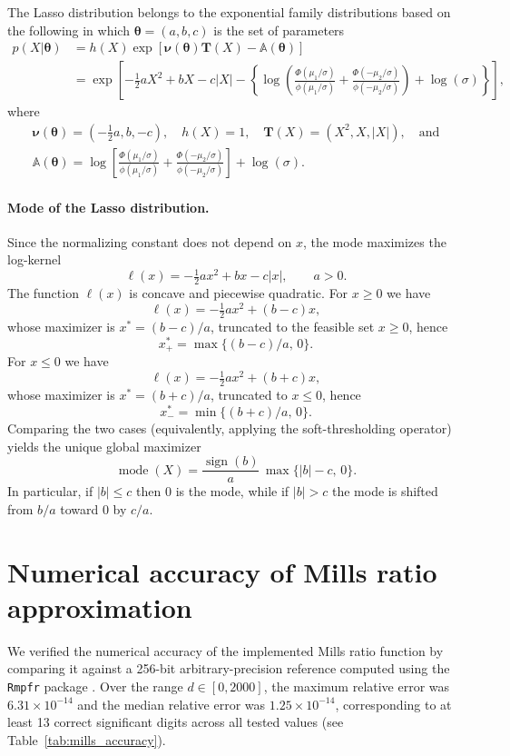 \documentclass[11pt]{article}
\begin{document}
The Lasso distribution belongs to the exponential family distributions based on the following in which ${\boldsymbol\theta} = (a, b, c)$ is the set of parameters
\begin{align*}
p(X|{\boldsymbol\theta})
    & = h(X)\exp\left[{\boldsymbol\nu}({\boldsymbol\theta}) \textbf{T}(X)-\mathbb{A}({\boldsymbol\theta})\right]\\ 
    & = \exp\left[ -\tfrac{1}{2}aX^2+bX-c|X| - \left\{ \log\left(\frac{\Phi(\mu_1/\sigma)}{\phi(\mu_1/\sigma)} + \frac{\Phi(-\mu_2/\sigma)}{\phi(-\mu_2/\sigma)} \right) + \log (\sigma)  \right\} \right], 
\end{align*}
where
$$
\begin{array}{c}
{\boldsymbol\nu}({\boldsymbol\theta}) 
    = (-\frac{1}{2}a,b,-c), 
    \quad
h(X) = 1, 
    \quad 
\textbf{T}(X) = (X^2,X,|X|), \quad \text{and}
\\
\displaystyle \mathbb{A}({\boldsymbol\theta}) 
    = \log\left[ \frac{\Phi(\mu_1/\sigma)}{\phi(\mu_1/\sigma)} + \frac{\Phi(-\mu_2/\sigma)}{\phi(-\mu_2/\sigma)} \right] + \log (\sigma).
\end{array}
$$


\paragraph{Mode of the Lasso distribution.}
Since the normalizing constant does not depend on $x$, the mode maximizes the log-kernel
\[
\ell(x)= -\tfrac12 a x^2 + b x - c|x|,\qquad a>0.
\]
The function $\ell(x)$ is concave and piecewise quadratic. For $x\ge 0$ we have
\[
\ell(x)= -\tfrac12 a x^2 + (b-c)x,
\]
whose maximizer is $x^*=(b-c)/a$, truncated to the feasible set $x\ge 0$, hence
\[
x^*_+ = \max\{(b-c)/a,\,0\}.
\]
For $x\le 0$ we have
\[
\ell(x)= -\tfrac12 a x^2 + (b+c)x,
\]
whose maximizer is $x^*=(b+c)/a$, truncated to $x\le 0$, hence
\[
x^*_- = \min\{(b+c)/a,\,0\}.
\]
Comparing the two cases (equivalently, applying the soft-thresholding operator) yields the unique global maximizer
\[
\operatorname{mode}(X)= \frac{\operatorname{sign}(b)}{a}\,\max\{|b|-c,\,0\}.
\]
In particular, if $|b|\le c$ then $0$ is the mode, while if $|b|>c$ the mode is shifted from $b/a$ toward $0$ by $c/a$.

\section{Numerical accuracy of Mills ratio approximation}
We verified the numerical accuracy of the implemented Mills ratio function by comparing it against a 256-bit arbitrary-precision reference computed using the \texttt{Rmpfr} package \citep{Rmpfr}. Over the range $d \in [0,2000]$, the maximum relative error was $6.31 \times 10^{-14}$ and the median relative error was $1.25 \times 10^{-14}$, corresponding to at least 13 correct significant digits across all tested values (see Table~\ref{tab:mills_accuracy}). 
\end{document}
